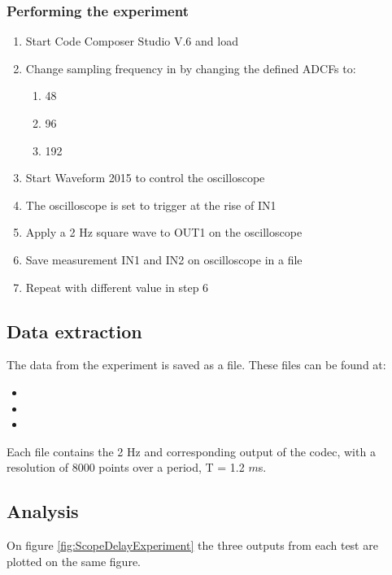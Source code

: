 \subsubsection{Performing the experiment}
\begin{enumerate}
	\item Start Code Composer Studio V.6 and load 
	\item Change sampling frequency in  by changing the defined ADCFs to:
	\begin{enumerate}
		\item 48
		\item 96
		\item 192
	\end{enumerate}
	\item Start Waveform 2015 to control the oscilloscope
	\item The oscilloscope is set to trigger at the rise of IN1
	\item Apply a 2 Hz square wave to OUT1 on the oscilloscope
	\item Save measurement IN1 and IN2 on oscilloscope in a  file
	\item Repeat with different value in step 6
\end{enumerate}


\subsection{Data extraction}

The data from the experiment is saved as a  file. These files can be found at:
\begin{itemize}
	\item {}
	\item {}
	\item {}
\end{itemize}

Each file contains the 2 Hz and corresponding output of the codec, with a resolution of 8000 points over a period, T = 1.2 $m$s.


\subsection{Analysis}\label{sec:AnalysisFsDelay}

On figure \ref{fig:ScopeDelayExperiment} the three outputs from each test are plotted on the same figure.

